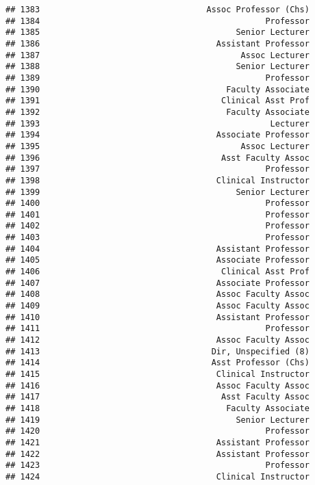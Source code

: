 \documentclass[
]{article}
\begin{document}
\begin{verbatim}
## 1383                                  Assoc Professor (Chs)
## 1384                                              Professor
## 1385                                        Senior Lecturer
## 1386                                    Assistant Professor
## 1387                                         Assoc Lecturer
## 1388                                        Senior Lecturer
## 1389                                              Professor
## 1390                                      Faculty Associate
## 1391                                     Clinical Asst Prof
## 1392                                      Faculty Associate
## 1393                                               Lecturer
## 1394                                    Associate Professor
## 1395                                         Assoc Lecturer
## 1396                                     Asst Faculty Assoc
## 1397                                              Professor
## 1398                                    Clinical Instructor
## 1399                                        Senior Lecturer
## 1400                                              Professor
## 1401                                              Professor
## 1402                                              Professor
## 1403                                              Professor
## 1404                                    Assistant Professor
## 1405                                    Associate Professor
## 1406                                     Clinical Asst Prof
## 1407                                    Associate Professor
## 1408                                    Assoc Faculty Assoc
## 1409                                    Assoc Faculty Assoc
## 1410                                    Assistant Professor
## 1411                                              Professor
## 1412                                    Assoc Faculty Assoc
## 1413                                   Dir, Unspecified (8)
## 1414                                   Asst Professor (Chs)
## 1415                                    Clinical Instructor
## 1416                                    Assoc Faculty Assoc
## 1417                                     Asst Faculty Assoc
## 1418                                      Faculty Associate
## 1419                                        Senior Lecturer
## 1420                                              Professor
## 1421                                    Assistant Professor
## 1422                                    Assistant Professor
## 1423                                              Professor
## 1424                                    Clinical Instructor

\end{verbatim}
\end{document}
